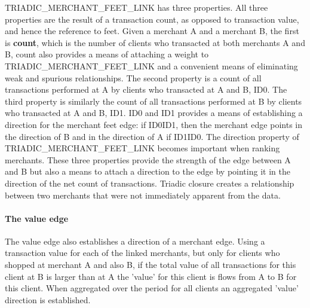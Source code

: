 TRIADIC\_MERCHANT\_FEET\_LINK has three properties.  All three properties are the result of a transaction count, as opposed to transaction value, and hence the reference to feet.  Given a merchant A and a merchant B, the first is \textbf{count}, which is the number of clients who transacted at both merchants A and B, count also provides a means of attaching a weight to TRIADIC\_MERCHANT\_FEET\_LINK and a convenient means of eliminating weak and spurious relationships.
The second property is a count of all transactions performed at A by clients who transacted at A and B, ID0.  The third property is similarly the count of all transactions performed at B by clients who transacted at A and B, ID1.  ID0 and ID1 provides a means of establishing a direction for the merchant feet edge: if ID0\<ID1, then the merchant edge points in the direction of B and in the direction of A if ID1\<ID0.  The direction property of TRIADIC\_MERCHANT\_FEET\_LINK becomes important when ranking merchants.
These three properties provide the strength of the edge between A and B but also a means to attach a direction to the edge by pointing it in the direction of the net count of transactions.
Triadic closure creates a relationship between two merchants that were not immediately apparent from the data.

\paragraph{The value edge}

The value edge also establishes a direction of a merchant edge.  Using a transaction value for each of the linked merchants, but only for clients who shopped at merchant A and also B, if the total value of all transactions for this client at B is larger than at A the 'value' for this client is flows from A to B for this client.  When aggregated over the period for all clients an aggregated 'value' direction is established.
